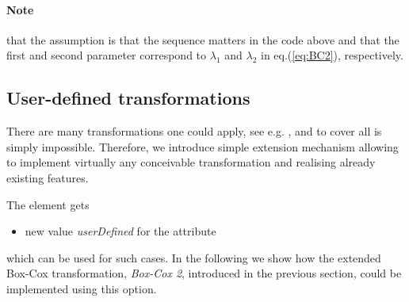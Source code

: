 \paragraph{Note} \marginpar{\HandCuffLeft} that the assumption is that the sequence matters 
in the code above and that the first and second parameter correspond 
to $\lambda_1$ and $\lambda_2$ in  eq.(\ref{eq:BC2}), respectively.

\subsection{User-defined transformations}
\label{sec:userDefTrafo}
There are many transformations one could apply, see e.g. \cite{Sakia:1992fu},
and to cover all is simply impossible. Therefore, we introduce simple extension 
mechanism allowing to implement virtually any conceivable transformation 
and realising already existing features. 

\bigskip
The  element gets 
\begin{itemize}
\item 
new value \textit{userDefined} for the  attribute 
\end{itemize}
which can be used for such cases. In the following
we show how the extended Box-Cox transformation, \textit{Box-Cox 2}, 
introduced in the previous section, could be implemented using this option.

